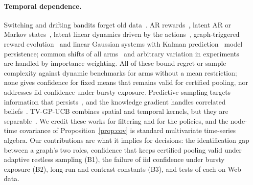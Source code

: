 \documentclass[sigconf,review,anonymous]{acmart}
\begin{document}
\paragraph{Temporal dependence.} Switching and drifting bandits forget old data~\cite{garivier2011switching,bogunovic2016tvgp,wu2019dynamic}. AR rewards~\cite{chen2023autoregressive,bacchiocchi2024arb}, latent AR or Markov states~\cite{trella2025latent,jin2026latent}, latent linear dynamics driven by the actions~\cite{choi2026etc,hwang2026block}, graph-triggered reward evolution~\cite{genalti2024graphtriggered} and linear Gaussian systems with Kalman prediction~\cite{gornet2024restless} model persistence; common shifts of all arms~\cite{zierahn2026shifting} and arbitrary variation in experiments~\cite{xiong2024abtesting} are handled by importance weighting. All of these bound regret or sample complexity against dynamic benchmarks for arms without a mean restriction; none gives confidence for fixed means that remains valid for certified pooling, nor addresses iid confidence under bursty exposure. Predictive sampling targets information that persists~\cite{liu2023predictive}, and the knowledge gradient handles correlated beliefs~\cite{frazier2009kg}. TV-GP-UCB combines spatial and temporal kernels, but they are separable~\cite{bogunovic2016tvgp}. We credit these works for filtering and for the policies, and the node-time covariance of Proposition~\ref{prop:cov} is standard multivariate time-series algebra. Our contributions are what it implies for decisions: the identification gap between a graph's two roles, confidence that keeps certified pooling valid under adaptive restless sampling (B1), the failure of iid confidence under bursty exposure (B2), long-run and contrast constants (B3), and tests of each on Web data.
\end{document}
